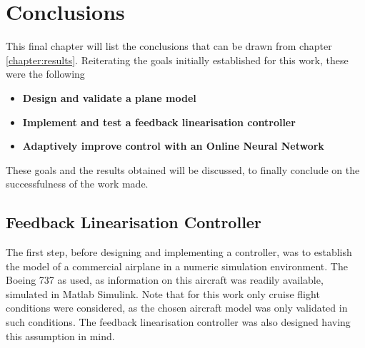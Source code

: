 
\chapter{Conclusions}
\label{chapter:conclusions}

This final chapter will list the conclusions that can be drawn from chapter \ref{chapter:results}. Reiterating the goals initially established for this work, these were the following

\begin{itemize}
\item \textbf{Design and validate a plane model}
\item \textbf{Implement and test a feedback linearisation controller}
\item \textbf{Adaptively improve control with an Online Neural Network}
\end{itemize}

These goals and the results obtained will be discussed, to finally conclude on the successfulness of the work made. 

\section{Feedback Linearisation Controller}
\label{section:conclusions/fbl_controller}

The first step, before designing and implementing a controller, was to establish the model of a commercial airplane in a numeric simulation environment. The Boeing 737 as used, as information on this aircraft was readily available, simulated in Matlab Simulink. Note that for this work only cruise flight conditions were considered, as the chosen aircraft model was only validated in such conditions. The feedback linearisation controller was also designed having this assumption in mind. 

